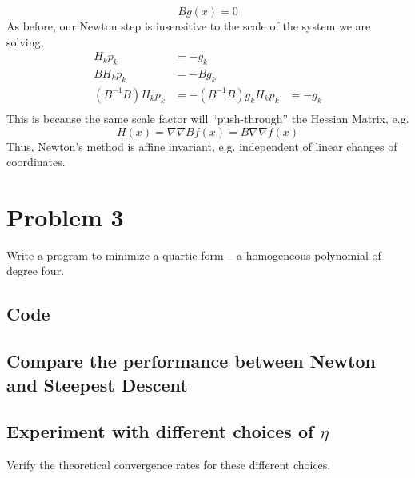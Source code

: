 \documentclass{article}
\begin{document}
\begin{equation}
 Bg(x) = 0
\end{equation}
As before, our Newton step is insensitive to the scale of the system we
are solving, 
\begin{align*}
 H_{k} p_{k}&=-g_{k}\\
 B H_{k} p_{k}&=- B g_{k}\\
 (B^{-1}B)H_{k} p_{k}&=-(B^{-1}B)g_{k}
 H_{k} p_{k}&=-g_{k}\\
\end{align*}
This is because the same scale factor will ``push-through'' the Hessian
Matrix, e.g. 
\begin{equation}
H(x) = \nabla\nabla B f(x) = B \nabla\nabla f(x) 
\end{equation}
Thus, Newton's method is affine invariant, e.g. independent of linear
changes of coordinates. 

\section{Problem 3}

Write a program to minimize a quartic form -- a homogeneous polynomial
of degree four. 

\subsection{Code}

\subsection{Compare the performance between Newton and Steepest Descent}

\subsection{Experiment with different choices of $\eta$}

Verify the theoretical convergence rates for these different choices. 
\end{document}
